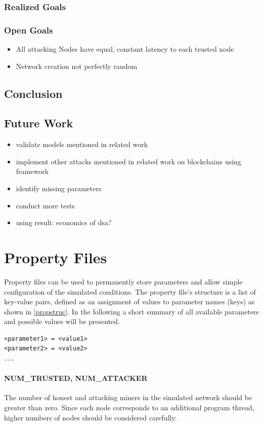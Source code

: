 \documentclass[a4paper,12pt,twoside]{report}
\begin{document}
\subsection{Realized Goals}

\subsection{Open Goals}
\begin{itemize}
\item All attacking Nodes have equal, constant latency to each trusted node
\item Network creation not perfectly random
\end{itemize}
\section{Conclusion}

\section{Future Work}
\begin{itemize}
\item validate models mentioned in related work
\item implement other attacks mentioned in related work on blockchains using framework
\item identify missing parameters
\item conduct more tests
\item using result: economics of dsa?
\end{itemize}




\appendix

\chapter{Property Files} \label{prop}
Property files can be used to permanently store parameters and allow simple configuration of the simulated conditions. The property file's structure is a list of key-value pairs, defined as an assignment of values to parameter names (keys) as shown in \autoref{propstruc}. In the following a short summary of all available parameters and possible values will be presented.
\begin{lstlisting}[caption=Property file structure,label=propstruc]
<parameter1> = <value1>
<parameter2> = <value2>
...
\end{lstlisting}
\subsubsection{NUM\_TRUSTED, NUM\_ATTACKER}
The number of honest and attacking miners in the simulated network should be greater than zero. Since each node corresponds to an additional program thread, higher numbers of nodes should be considered carefully.
\end{document}
